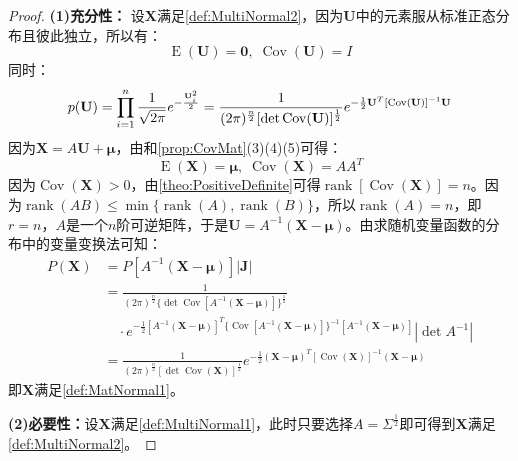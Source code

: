 \begin{proof}
	\textbf{(1)充分性：}
	设$\mathbf{X}$满足\cref{def:MultiNormal2}，因为$\mathbf{U}$中的元素服从标准正态分布且彼此独立，所以有：
	\begin{equation*}
		\operatorname{E}(\mathbf{U})=\mathbf{0},\;\operatorname{Cov}(\mathbf{U})=I
	\end{equation*}
	同时：
	\begin{equation*}
		p(\mathbf{U})
		=\prod_{i=1}^n\frac{1}{\sqrt{2\pi}}e^{-\frac{\mathbf{U}_i^2}{2}} \\
		=\frac{1}{(2\pi)^{\frac{n}{2}}[\det \operatorname{Cov}(\mathbf{U})]^{\frac{1}{2}}}e^{-\frac{1}{2}\mathbf{U}^T[\operatorname{Cov}(\mathbf{U})]^{-1}\mathbf{U}}
	\end{equation*}
	因为$\mathbf{X}=A\mathbf{U}+\boldsymbol{\mu}$，由和\cref{prop:CovMat}(3)(4)(5)可得：
	\begin{equation*}
		\operatorname{E}(\mathbf{X})=\boldsymbol{\mu},\;\operatorname{Cov}(\mathbf{X})=AA^T
	\end{equation*}
	因为$\operatorname{Cov}(\mathbf{X})>0$，由\cref{theo:PositiveDefinite}可得$\operatorname{rank}[\operatorname{Cov}(\mathbf{X})]=n$。因为$\operatorname{rank}(AB)\leqslant\min\{\operatorname{rank}(A),\operatorname{rank}(B)\}$，所以$\operatorname{rank}(A)=n$，即$r=n$，$A$是一个$n$阶可逆矩阵，于是$\mathbf{U}=A^{-1}(\mathbf{X}-\boldsymbol{\mu})$。由求随机变量函数的分布中的变量变换法可知：
	\begin{align*}
		P(\mathbf{X})
		&=P[A^{-1}(\mathbf{X}-\boldsymbol{\mu})]|\mathbf{J}| \\
		&=\frac{1}{(2\pi)^{\frac{n}{2}}\{\det \operatorname{Cov}[A^{-1}(\mathbf{X}-\boldsymbol{\mu})]\}^{\frac{1}{2}}} \\
		&\quad\cdot e^{-\frac{1}{2}[A^{-1}(\mathbf{X}-\boldsymbol{\mu})]^T\{ \operatorname{Cov}[A^{-1}(\mathbf{X}-\boldsymbol{\mu})]\}^{-1}[A^{-1}(\mathbf{X}-\boldsymbol{\mu})]}|\det A^{-1}| \\
		&=\frac{1}{(2\pi)^{\frac{n}{2}}[\det \operatorname{Cov}(\mathbf{X})]^{\frac{1}{2}}}e^{-\frac{1}{2}(\mathbf{X}-\boldsymbol{\mu})^T[\operatorname{Cov}(\mathbf{X})]^{-1}(\mathbf{X}-\boldsymbol{\mu})}
	\end{align*}
	即$\mathbf{X}$满足\cref{def:MatNormal1}。\par
	\textbf{(2)必要性：}设$\mathbf{X}$满足\cref{def:MultiNormal1}，此时只要选择$A=\Sigma^\frac{1}{2}$即可得到$\mathbf{X}$满足\cref{def:MultiNormal2}。
\end{proof}

